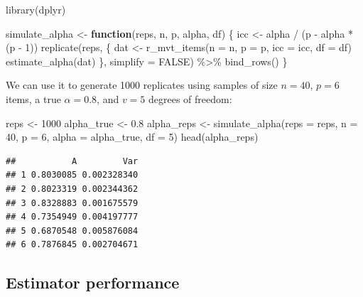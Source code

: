 \documentclass[
]{book}
\newenvironment{Shaded}{\begin{snugshade}}{\end{snugshade}}
\newcommand{\AttributeTok}[1]{\textcolor[rgb]{0.77,0.63,0.00}{#1}}
\newcommand{\ConstantTok}[1]{\textcolor[rgb]{0.00,0.00,0.00}{#1}}
\newcommand{\ControlFlowTok}[1]{\textcolor[rgb]{0.13,0.29,0.53}{\textbf{#1}}}
\newcommand{\DecValTok}[1]{\textcolor[rgb]{0.00,0.00,0.81}{#1}}
\newcommand{\FloatTok}[1]{\textcolor[rgb]{0.00,0.00,0.81}{#1}}
\newcommand{\FunctionTok}[1]{\textcolor[rgb]{0.00,0.00,0.00}{#1}}
\newcommand{\NormalTok}[1]{#1}
\newcommand{\OtherTok}[1]{\textcolor[rgb]{0.56,0.35,0.01}{#1}}
\newcommand{\SpecialCharTok}[1]{\textcolor[rgb]{0.00,0.00,0.00}{#1}}
\begin{document}
\begin{Shaded}
\begin{Highlighting}[]
\FunctionTok{library}\NormalTok{(dplyr)}

\NormalTok{simulate\_alpha }\OtherTok{\textless{}{-}} \ControlFlowTok{function}\NormalTok{(reps, n, p, alpha, df) \{}
\NormalTok{  icc }\OtherTok{\textless{}{-}}\NormalTok{ alpha }\SpecialCharTok{/}\NormalTok{ (p }\SpecialCharTok{{-}}\NormalTok{ alpha }\SpecialCharTok{*}\NormalTok{ (p }\SpecialCharTok{{-}} \DecValTok{1}\NormalTok{))}
  \FunctionTok{replicate}\NormalTok{(reps, \{}
\NormalTok{    dat }\OtherTok{\textless{}{-}} \FunctionTok{r\_mvt\_items}\NormalTok{(}\AttributeTok{n =}\NormalTok{ n, }\AttributeTok{p =}\NormalTok{ p, }\AttributeTok{icc =}\NormalTok{ icc, }\AttributeTok{df =}\NormalTok{ df)}
    \FunctionTok{estimate\_alpha}\NormalTok{(dat)}
\NormalTok{  \}, }\AttributeTok{simplify =} \ConstantTok{FALSE}\NormalTok{) }\SpecialCharTok{\%\textgreater{}\%}
  \FunctionTok{bind\_rows}\NormalTok{()}
\NormalTok{\}}
\end{Highlighting}
\end{Shaded}

We can use it to generate 1000 replicates using samples of size \(n = 40\), \(p = 6\) items, a true \(\alpha = 0.8\), and \(v = 5\) degrees of freedom:

\begin{Shaded}
\begin{Highlighting}[]
\NormalTok{reps }\OtherTok{\textless{}{-}} \DecValTok{1000}
\NormalTok{alpha\_true }\OtherTok{\textless{}{-}} \FloatTok{0.8}
\NormalTok{alpha\_reps }\OtherTok{\textless{}{-}} \FunctionTok{simulate\_alpha}\NormalTok{(}\AttributeTok{reps =}\NormalTok{ reps, }\AttributeTok{n =} \DecValTok{40}\NormalTok{, }\AttributeTok{p =} \DecValTok{6}\NormalTok{, }\AttributeTok{alpha =}\NormalTok{ alpha\_true, }\AttributeTok{df =} \DecValTok{5}\NormalTok{)}
\FunctionTok{head}\NormalTok{(alpha\_reps)}
\end{Highlighting}
\end{Shaded}

\begin{verbatim}
##           A         Var
## 1 0.8030085 0.002328340
## 2 0.8023319 0.002344362
## 3 0.8328883 0.001675579
## 4 0.7354949 0.004197777
## 5 0.6870548 0.005876084
## 6 0.7876845 0.002704671
\end{verbatim}

\hypertarget{estimator-performance}{%
\subsection{Estimator performance}\label{estimator-performance}}
\end{document}
